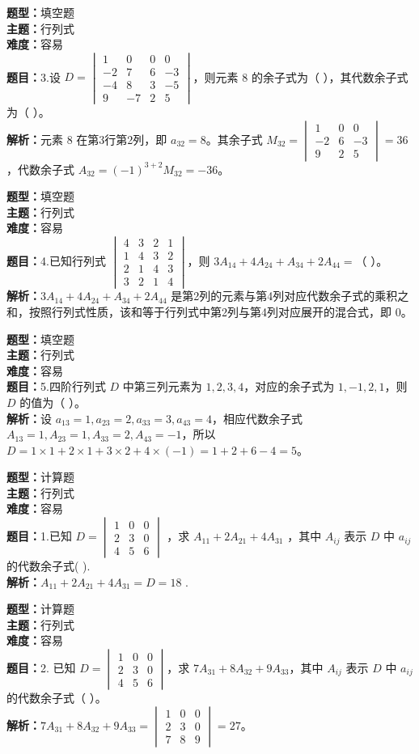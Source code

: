\documentclass{ctexart}
\newenvironment{question}[5]{%
	\noindent\textbf{题型：}#1\\
	\textbf{主题：}#2\\
	\textbf{难度：}#3\\
	\textbf{题目：}#4\\
	\textbf{解析：}#5\\
	\vspace{1em}
}{}
\begin{document}
	\begin{question}
		{填空题}
		{行列式}
		{容易}
		{3.设 $D=\begin{vmatrix}1 & 0 & 0 & 0 \\ -2 & 7 & 6 & -3 \\ -4 & 8 & 3 & -5 \\ 9 & -7 & 2 & 5\end{vmatrix}$，则元素 8 的余子式为（ ），其代数余子式为（ ）。}
		{元素 8 在第3行第2列，即 $a_{32}=8$。其余子式 $M_{32} = \begin{vmatrix}1 & 0 & 0 \\ -2 & 6 & -3 \\ 9 & 2 & 5\end{vmatrix} = 36$，代数余子式 $A_{32} = (-1)^{3+2} M_{32} = -36$。}
	\end{question}
	
	\begin{question}
		{填空题}
		{行列式}
		{容易}
		{4.已知行列式 $\begin{vmatrix}4 & 3 & 2 & 1 \\ 1 & 4 & 3 & 2 \\ 2 & 1 & 4 & 3 \\ 3 & 2 & 1 & 4\end{vmatrix}$，则 $3A_{14}+4A_{24}+A_{34}+2A_{44}=$（ ）。}
		{$3A_{14}+4A_{24}+A_{34}+2A_{44}$ 是第2列的元素与第4列对应代数余子式的乘积之和，按照行列式性质，该和等于行列式中第2列与第4列对应展开的混合式，即 $0$。}
	\end{question}
	
	\begin{question}
		{填空题}
		{行列式}
		{容易}
		{5.四阶行列式 $D$ 中第三列元素为 $1,2,3,4$，对应的余子式为 $1,-1,2,1$，则 $D$ 的值为（ ）。}
		{设 $a_{13}=1, a_{23}=2, a_{33}=3, a_{43}=4$，相应代数余子式 $A_{13}=1, A_{23}=1, A_{33}=2, A_{43}=-1$，所以 $D=1\times1 + 2\times1 + 3\times2 + 4\times(-1) = 1+2+6-4=5$。}
	\end{question}
	
	\begin{question}
		{计算题}
		{行列式}
		{容易}
		{1.已知 $D=\begin{vmatrix}1 & 0 & 0 \\ 2 & 3 & 0 \\ 4 & 5 & 6\end{vmatrix}$ ，求 $A_{11}+2 A_{21}+4 A_{31}$ ，其中 $A_{i j}$ 表示 $D$ 中 $a_{i j}$ 的代数余子式(  ).}
		{$A_{11}+2 A_{21}+4 A_{31}=D=18$ .}
	\end{question}
	
	
	\begin{question}
		{计算题}
		{行列式}
		{容易}
		{2. 已知 $D=\begin{vmatrix}1 & 0 & 0 \\ 2 & 3 & 0 \\ 4 & 5 & 6\end{vmatrix}$，求 $7 A_{31} + 8 A_{32} + 9 A_{33}$，其中 $A_{ij}$ 表示 $D$ 中 $a_{ij}$ 的代数余子式（ ）。}
		{$7 A_{31} + 8 A_{32} + 9 A_{33} = \begin{vmatrix}1 & 0 & 0 \\ 2 & 3 & 0 \\ 7 & 8 & 9\end{vmatrix} = 27$。}
	\end{question}
	
\end{document}
